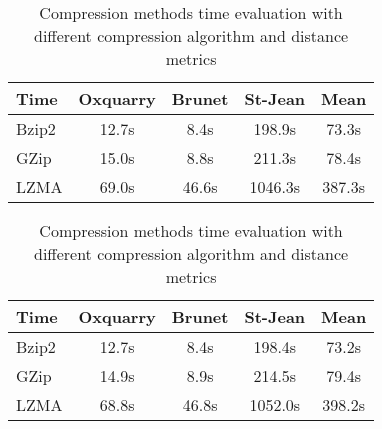 \begin{table}
  \centering
  \caption{Compression methods time evaluation with different compression algorithm and distance metrics}
  \label{tab:compression_evaluation_times}

  \begin{tabular}{l c c c|c}
    \toprule
    Time      & Oxquarry  & Brunet & St-Jean & Mean\\
    \midrule
    Bzip2     & 12.7s     & 8.4s   & 198.9s  & 73.3s\\
    GZip      & 15.0s     & 8.8s   & 211.3s  & 78.4s\\
    LZMA      & 69.0s     & 46.6s  & 1046.3s & 387.3s\\
    \bottomrule
  \end{tabular}

  \vspace{0.5cm}

  \begin{tabular}{l c c c|c}
    \toprule
    Time      & Oxquarry & Brunet & St-Jean & Mean\\
    \midrule
    Bzip2     & 12.7s    & 8.4s   & 198.4s  & 73.2s\\
    GZip      & 14.9s    & 8.9s   & 214.5s  & 79.4s\\
    LZMA      & 68.8s    & 46.8s  & 1052.0s & 398.2s\\
    \bottomrule
  \end{tabular}
\end{table}
